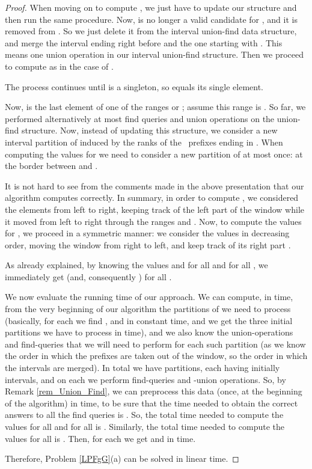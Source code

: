 \documentclass[final]{dmtcs-episciences}
\begin{document}
\begin{proof}
When moving on to compute , we just have to update our structure and then run the same procedure. Now,  is no longer a valid candidate for , and it is removed from . So we just delete it from the interval union-find data structure, and merge the interval ending right before  and the one starting with . This means one union operation in our interval union-find structure. Then we proceed to compute  as in the case of .

The process continues until  is a singleton, so  equals its single element.

Now,  is the last element of one of the ranges  or ; assume this range is . So far, we performed alternatively at most  find queries and  union operations on the union-find structure. Now,  instead of updating this structure, we consider a new interval partition of  induced by the ranks of the~ prefixes ending in . When computing the values  for  we need to consider a new partition of  at most once: at the border between  and .

It is not hard to see from the comments made in the above presentation that our algorithm computes  correctly. In summary, in order to compute , we considered the elements  from left to right, keeping track of the left part  of the window  while it moved from left to right through the ranges  and . Now, to compute the values  for , we proceed in a symmetric manner: we consider the values  in decreasing order, moving the window from right to left, and keep track of its right part . 

As already explained, by knowing the values  and  for all  and for all , we immediately get  (and, consequently ) for all . 

We now evaluate the running time of our approach. We can compute, in  time, from the very beginning of our algorithm the partitions of  we need to process (basically, for each  we find ,  and  in constant time, and we get the three initial partitions we have to process in  time), and we also know the union-operations and find-queries that we will need to perform for each such partition (as we know the order in which the prefixes are taken out of the window, so the order in which the intervals are merged). In total we have  partitions, each having initially  intervals, and on each we perform  find-queries and -union operations. So, by Remark \ref{rem_Union_Find}, we can preprocess this data (once, at the beginning of the algorithm) in  time, to be sure that the time needed to obtain the correct answers to all the find queries is . So, the total time needed to compute the values  for all  and for all  is . Similarly, the total time needed to compute the values  for all  is . Then, for each  we get  and  in  time.

Therefore, Problem \ref{LPFgG}(a) can be solved in linear time.
\end{proof}
\end{document}
